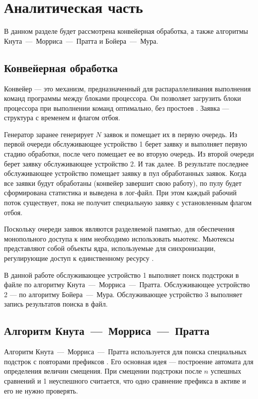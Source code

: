 \chapter{Аналитическая часть}
В данном разделе будет рассмотрена конвейерная обработка, а также алгоритмы Кнута~---~Морриса~---~Пратта и Бойера~---~Мура.

\section{Конвейерная обработка}

Конвейер --- это механизм, предназначенный для распараллеливания выполнения команд программы между блоками процессора. Он позволяет загрузить блоки процессора при выполнении команд оптимально, без простоев \cite{conv}. Заявка --- структура с временем и флагом отбоя.

Генератор заранее генерирует $N$ заявок и помещает их в первую очередь. Из первой очереди обслуживающее устройство 1 берет заявку и выполняет первую стадию обработки, после чего помещает ее во вторую очередь. Из второй очереди берет заявку обслуживающее устройство 2. И так далее. В результате последнее обслуживающее устройство помещает заявку в пул обработанных заявок. Когда все заявки будут обработаны (конвейер завершит свою работу), по пулу будет сформирована статистика и выведена в лог-файл. При этом каждый рабочий поток существует, пока не получит специальную заявку с установленным флагом отбоя.

Поскольку очереди заявок являются разделяемой памятью, для обеспечения монопольного доступа к ним необходимо использовать мьютекс. Мьютексы представляют собой объекты ядра, используемые для синхронизации, регулирующие доступ к единственному ресурсу \cite{mutex}.

В данной работе обслуживающее устройство 1 выполняет поиск подстроки в файле по алгоритму Кнута~---~Морриса~---~Пратта. Обслуживающее устройство 2 --- по алгоритму Бойера~---~Мура. Обслуживающее устройство 3 выполняет запись результатов поиска в файл.

\section{Алгоритм Кнута~---~Морриса~---~Пратта}

Алгоритм Кнута~---~Морриса~---~Пратта используется для поиска специальных подстрок с повторами префиксов \cite{kmp}. Его основная идея --- построение автомата для определения величин смещения. При смещении подстроки после $n$ успешных сравнений и 1 неуспешного считается, что одно сравнение префикса в активе и его не нужно проверять.

